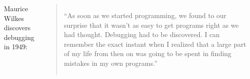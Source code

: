 \documentclass[aspectratio=169,usenames,dvipsnames]{beamer}
\begin{document}
\begin{frame}




    \begin{columns}
    Maurice Wilkes discovers debugging in 1949:

    \vspace{1em}
    \begin{quote}\normalfont
    ``As soon as we started programming, we found to our surprise that it
    wasn't as easy to get programs right as we had thought. Debugging had to be
    discovered. I can remember the exact instant when I realized that a large
    part of my life from then on was going to be spent in finding mistakes in
    my own programs.''
    \end{quote}
    \end{columns}
\end{frame}
\end{document}
